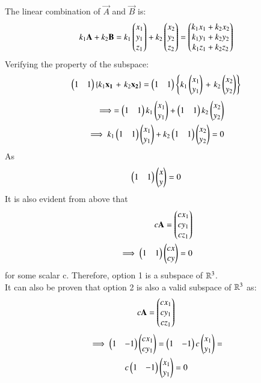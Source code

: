 \documentclass[journal,12pt,twocolumn]{IEEEtran}
\begin{document}
The linear combination of $\vec{A}$ and $\vec{B}$ is:
\begin{align}
  k_1\mathbf{A} + k_2\mathbf{B} = k_1\begin{pmatrix}x_1 \\ y_1 \\ z_1\end{pmatrix} + k_2\begin{pmatrix}x_2 \\ y_2 \\ z_2\end{pmatrix} = \begin{pmatrix}k_1x_1 + k_2x_2 \\ k_1y_1 + k_2y_2 \\ k_1z_1 + k_2z_2\end{pmatrix}
\end{align}
Verifying the property of the subspace:
\begin{multline}
  \begin{pmatrix}1 & 1\end{pmatrix}\left\{k_1\mathbf{x_1}\right. + \left.k_2\mathbf{x_2}\right\} = \begin{pmatrix}1 & 1\end{pmatrix}\left\{k_1\begin{pmatrix}x_1 \\ y_1\end{pmatrix}\right. + \left.k_2\begin{pmatrix}x_2 \\ y_2\end{pmatrix}\right\}
\end{multline}
\begin{align}
  \implies = \begin{pmatrix}1 & 1\end{pmatrix}k_1\begin{pmatrix}x_1 \\ y_1\end{pmatrix} + \begin{pmatrix}1 & 1\end{pmatrix}k_2\begin{pmatrix}x_2 \\ y_2\end{pmatrix} \\
  \implies k_1\begin{pmatrix}1 & 1\end{pmatrix}\begin{pmatrix}x_1 \\ y_1\end{pmatrix} + k_2\begin{pmatrix}1 & 1\end{pmatrix}\begin{pmatrix}x_2 \\ y_2\end{pmatrix} = 0
\end{align}
As
\begin{align}
  \begin{pmatrix}1 & 1\end{pmatrix}\begin{pmatrix}x \\ y\end{pmatrix} = 0
\end{align}
It is also evident from above that
\begin{align}
  c\mathbf{A} = \begin{pmatrix}cx_1 \\ cy_1 \\ cz_1\end{pmatrix} \\
  \implies \begin{pmatrix}1 & 1\end{pmatrix}\begin{pmatrix}cx \\ cy\end{pmatrix} = 0
\end{align}
for some scalar c. Therefore, option 1 is a subspace of $\mathbb{R}^3$. \\
It can also be proven that option 2 is also a valid subspace of $\mathbb{R}^3$ as:
\begin{align}
  c\mathbf{A} = \begin{pmatrix}cx_1 \\ cy_1 \\ cz_1\end{pmatrix}
\end{align}
\begin{multline}
    \implies \begin{pmatrix}1 & -1\end{pmatrix}\begin{pmatrix}cx_1 \\ cy_1\end{pmatrix} = \begin{pmatrix}1 & -1\end{pmatrix}c\begin{pmatrix}x_1 \\ y_1\end{pmatrix} = \\
    c\begin{pmatrix}1 & -1\end{pmatrix}\begin{pmatrix}x_1 \\ y_1\end{pmatrix} = 0 \\
\end{multline}
\end{document}
